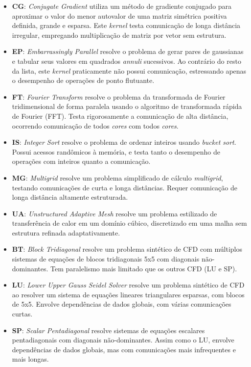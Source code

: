 \documentclass[12pt]{article}
\begin{document}
\vspace{-1mm}
\begin{itemize}

\item \textbf{CG}: \emph{Conjugate Gradient} utiliza um método de gradiente conjugado para aproximar o valor do menor autovalor de uma matriz simétrica positiva definida, grande e esparsa. Este \emph{kernel} testa comunicação de longa distância irregular, empregando multiplicação de matriz por vetor sem estrutura.
\item \textbf{EP}: \emph{Embarrassingly Parallel} resolve o problema de gerar pares de gaussianas e tabular seus valores em quadrados \emph{annuli} sucessivos. Ao contrário do resto da lista, este \emph{kernel} praticamente não possui comunicação, estressando apenas o desempenho de operações de ponto flutuante.
\item \textbf{FT}: \emph{Fourier Transform} resolve o problema da transformada de Fourier tridimensional de forma paralela usando o algoritmo de transformada rápida de Fourier (FFT). Testa rigorosamente a comunicação de alta distância, ocorrendo comunicação de todos \emph{cores} com todos \emph{cores}. 
\item \textbf{IS}: \emph{Integer Sort} resolve o problema de ordenar inteiros usando \emph{bucket sort}. Possui acessos randômicos à memória, e testa tanto o desempenho de operações com inteiros quanto a comunicação.
\item \textbf{MG}: \emph{Multigrid} resolve um problema simplificado de cálculo \emph{multigrid}, testando comunicações de curta e longa distâncias. Requer comunicação de longa distância altamente estruturada.
\item \textbf{UA}: \emph{Unstructured Adaptive Mesh} resolve um problema estilizado de transferência de calor em um domínio cúbico, discretizado em uma malha sem estrutura refinada adaptativamente.
\item \textbf{BT}: \emph{Block Tridiagonal} resolve um problema sintético de CFD com múltiplos sistemas de equações de blocos tridiagonais 5x5 com diagonais não-dominantes. Tem paralelismo mais limitado que os outros CFD (LU e SP).
\item \textbf{LU}: \emph{Lower Upper Gauss Seidel Solver} resolve um problema sintético de CFD ao resolver um sistema de equações lineares triangulares esparsas, com blocos de 5x5. Envolve dependências de dados globais, com várias comunicações curtas.
\item \textbf{SP}: \emph{Scalar Pentadiagonal} resolve sistemas de equações escalares pentadiagonais com diagonais não-dominantes. 
Assim como o LU, envolve dependências de dados globais, mas com comunicações mais infrequentes e mais longas.
\end{itemize}
\end{document}
